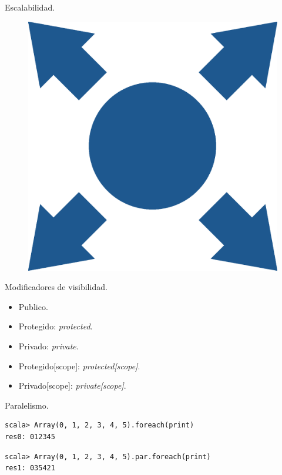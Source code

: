 \documentclass[10pt]{beamer}
\begin{document}
\begin{frame}[fragile]{Escalabilidad.}
	\begin{figure}[H]
	\centering
	\includegraphics[scale=0.15]{./imagenes/scalable}
	\end{figure}
\end{frame}

\begin{frame}[fragile]{Modificadores de visibilidad.}
	\begin{itemize}
		\item Publico.
		\item Protegido: \textit{protected}.
		\item Privado: \textit{private}.
		\item Protegido[scope]: \textit{protected[scope]}.
		\item Privado[scope]: \textit{private[scope]}.
	\end{itemize}
\end{frame}

\begin{frame}[fragile]{Paralelismo.}
\begin{lstlisting}[frame=single, basicstyle=\scriptsize, breaklines=true]
scala> Array(0, 1, 2, 3, 4, 5).foreach(print)
res0: 012345
\end{lstlisting}

\begin{lstlisting}[frame=single, basicstyle=\scriptsize, breaklines=true]
scala> Array(0, 1, 2, 3, 4, 5).par.foreach(print)
res1: 035421
\end{lstlisting}
\end{frame}
\end{document}
